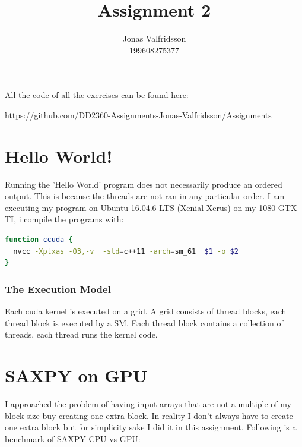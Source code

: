 \documentclass{article}
\title{Assignment 2}
\date{}
\author{Jonas Valfridsson\\199608275377}
\begin{document}
\maketitle
\tableofcontents

All the code of all the exercises can be found here:

\href{https://github.com/DD2360-Assignments-Jonas-Valfridsson/Assignments}{https://github.com/DD2360-Assignments-Jonas-Valfridsson/Assignments}

\section*{Hello World!}%
\label{sec:hello_world_}


Running the 'Hello World' program does not necessarily produce an ordered output. This is because the threads are not ran in any particular order. I am
executing my program on Ubuntu 16.04.6 LTS (Xenial Xerus) on my 1080 GTX TI, i compile the programs with: 


\begin{mdframed}[backgroundcolor=codeColor,leftmargin=0.0cm,hidealllines=true,%
  innerleftmargin=0.1cm,innerrightmargin=0.1cm,innertopmargin=0.5cm,innerbottommargin=0.10cm,
  roundcorner=15pt]
\begin{lstlisting}[language=bash]
function ccuda {
  nvcc -Xptxas -O3,-v  -std=c++11 -arch=sm_61  $1 -o $2
}
\end{lstlisting}
\end{mdframed}


\subsubsection*{The Execution Model}%
\label{ssub:}

Each cuda kernel is executed on a grid. A grid consists of thread blocks, each thread block is executed by a SM. Each thread block contains a collection of
threads, each thread runs the kernel code.


\section*{SAXPY on GPU}%
\label{sec:saxpy_on_gpu}

I approached the problem of having input arrays that are not a multiple of my block size buy creating one extra block. In reality I don't always have to create
one extra block but for simplicity sake I did it in this assignment. Following is a benchmark of SAXPY CPU vs GPU:
\end{document}
